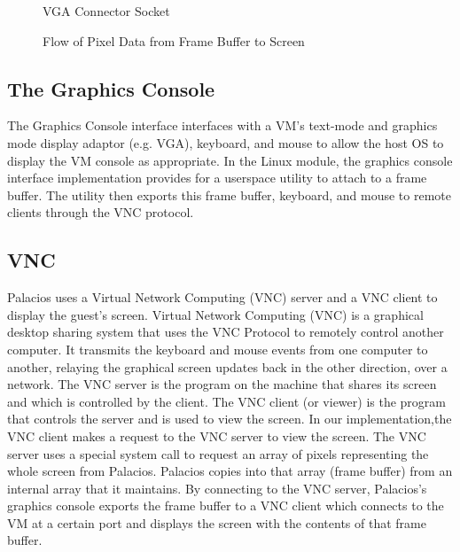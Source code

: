 \documentclass{acm_proc_article-sp}
\begin{document}
\begin{figure}                                              
\centering                                                     
{}                   
\caption{VGA Connector Socket}   
\end{figure} 

\begin{figure}                                              
\centering                                                     
{}                   
\caption{Flow of Pixel Data from Frame Buffer to Screen}   
\end{figure} 

\subsection{The Graphics Console} %
The Graphics Console interface interfaces with a VM's text-mode and graphics
mode display adaptor (e.g. VGA), keyboard, and mouse to allow the host OS to display the VM
console as appropriate. In the Linux module, the graphics console interface implementation provides
for a userspace utility to attach to a frame buffer. The utility then exports this frame buffer, keyboard,
and mouse to remote clients through the VNC protocol. \cite{techreport}

\subsection{VNC}
Palacios uses a Virtual Network Computing (VNC) server and a VNC client to
display the guest's screen. 
Virtual Network Computing (VNC) is a graphical desktop sharing system that uses the VNC Protocol to remotely control another computer. 
It transmits the keyboard and mouse events from one computer to another, relaying the graphical screen updates back in the other direction, over a network.
The VNC server is the program on the machine that shares its screen and which is controlled by the client.
The VNC client (or viewer) is the program that controls the server and is used to view the screen.
In our implementation,the VNC client makes a request to the VNC server to view the screen. 
The VNC server uses a special system call to request an array of pixels representing the whole screen from Palacios. 
Palacios copies into that array (frame buffer) from an internal array that it
maintains. By connecting to the VNC server, Palacios's graphics console exports
the frame buffer to a VNC client which connects to the VM at a certain port and
displays the screen with the contents of that frame buffer.
\end{document}

